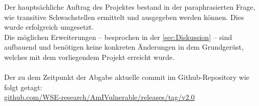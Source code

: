     Der hauptsächliche Auftrag des Projektes bestand in der paraphrasierten Frage, wie transitive Schwachstellen ermittelt und ausgegeben werden können.
    Dies wurde erfolgreich umgesetzt.
    \\
    Die möglichen Erweiterungen -- besprochen in der \ref{sec:Diskussion}  -- sind aufbauend und benötigen keine konkreten Änderungen in dem Grundgerüst, welches mit dem vorliegendem Projekt erreicht wurde.
    \\ \\
    Der zu dem Zeitpunkt der Abgabe aktuelle commit im Github-Repository wie folgt getagt: \\
    \href{https://github.com/WSE-research/AmIVulnerable/releases/tag/v2.0}{github.com/WSE-research/AmIVulnerable/releases/tag/v2.0}
